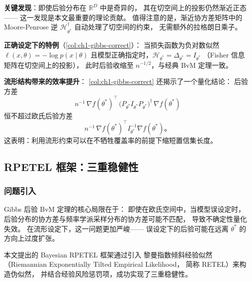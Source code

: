 \textbf{关键发现}：即使后验分布在 $\mathbb{R}^D$ 中是奇异的，
其在切空间上的投影仍然渐近正态——
这一发现是本文最重要的理论贡献。
值得注意的是，渐近协方差矩阵中的 Moore-Penrose 逆
$\mathcal{H}_{\theta^*}^\dagger$ 自动处理了切空间的约束，
无需额外的拉格朗日乘子。

\textbf{正确设定下的特例}（\cref{col:ch1-gibbs-correct}）：
当损失函数为负对数似然 $\ell(x,\theta)=-\log p(x\mid\theta)$
且模型正确指定时，$\mathcal{H}_{\theta^*}=\Delta_{\theta^*}=I_{\theta^*}$
（Fisher 信息矩阵在切空间上的投影），
此时后验收缩至 $n^{-1/2}$，与经典 BvM 定理一致。


\textbf{流形结构带来的效率提升}：
\cref{col:ch1-gibbs-correct} 还揭示了一个量化结论：
后验方差
\[
n^{-1}\,\nabla f(\theta^*)^\top\,
\big(P_{\theta^*}I_{\theta^*}P_{\theta^*}\big)^\dagger\,
\nabla f(\theta^*)
\]
恒不超过欧氏后验方差
\[
n^{-1}\,\nabla f(\theta^*)^\top I_{\theta^*}^{-1}\nabla f(\theta^*)\text{。}
\]
这表明：利用流形约束可以在不牺牲覆盖率的前提下缩短置信集长度。

\subsection{RPETEL 框架：三重稳健性}\label{sec:ch1-rpetel}

\subsubsection{问题引入}\label{sec:ch1-rpetel-intro}

Gibbs 后验 BvM 定理的核心局限在于：
即使在欧氏空间中，当模型误设定时，
后验分布的协方差与频率学派采样分布的协方差可能不匹配，
导致不确定性量化失效。
在流形设定下，这一问题更加严峻——
误设定下的后验可能在远离 $\theta^*$ 的方向上过度扩张。

本文提出的 Bayesian RPETEL 框架通过引入
黎曼指数倾斜经验似然（Riemannian Exponentially Tilted Empirical Likelihood，
简称 RETEL）来构造伪似然，
并结合经验风险惩罚项，成功实现了三重稳健性。

